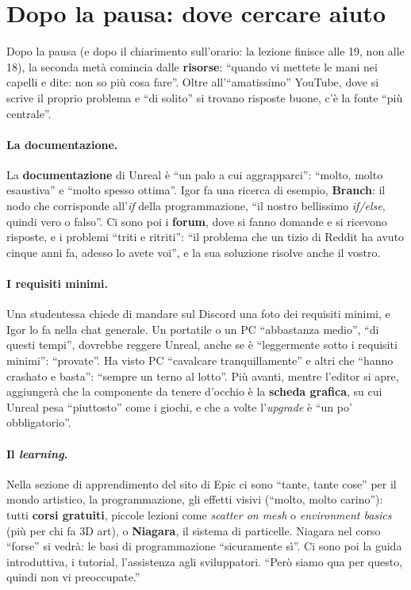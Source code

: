 \section{Dopo la pausa: dove cercare aiuto}
\label{ue1:sec:risorse}

Dopo la pausa (e dopo il chiarimento sull'orario: la lezione finisce alle 19, non alle
18), la seconda metà comincia dalle \textbf{risorse}: ``quando vi mettete le mani nei
capelli e dite: non so più cosa fare''. Oltre all'``amatissimo'' YouTube, dove si
scrive il proprio problema e ``di solito'' si trovano risposte buone, c'è la fonte
``più centrale''.

\paragraph{La documentazione.} La \textbf{documentazione} di Unreal è ``un palo a cui
aggrapparci'': ``molto, molto esaustiva'' e ``molto spesso ottima''. Igor fa una ricerca
di esempio, \textbf{Branch}: il nodo che corrisponde all'\emph{if} della
programmazione, ``il nostro bellissimo \emph{if/else}, quindi vero o falso''. Ci sono
poi i \textbf{forum}, dove si fanno domande e si ricevono risposte, e i problemi
``triti e ritriti'': ``il problema che un tizio di Reddit ha avuto cinque anni fa,
adesso lo avete voi'', e la sua soluzione risolve anche il vostro.

\paragraph{I requisiti minimi.} Una studentessa chiede di mandare sul Discord una foto
dei requisiti minimi, e Igor lo fa nella chat generale. Un portatile o un PC ``abbastanza
medio'', ``di questi tempi'', dovrebbe reggere Unreal, anche se è ``leggermente sotto i
requisiti minimi'': ``provate''. Ha visto PC ``cavalcare tranquillamente'' e altri che
``hanno crashato e basta'': ``sempre un terno al lotto''. Più avanti, mentre l'editor si
apre, aggiungerà che la componente da tenere d'occhio è la \textbf{scheda grafica}, su
cui Unreal pesa ``piuttosto'' come i giochi, e che a volte l'\emph{upgrade} è ``un po'
obbligatorio''.

\paragraph{Il \emph{learning}.} Nella sezione di apprendimento del sito di Epic ci sono
``tante, tante cose'' per il mondo artistico, la programmazione, gli effetti visivi
(``molto, molto carino''): tutti \textbf{corsi gratuiti}, piccole lezioni come
\emph{scatter on mesh} o \emph{environment basics} (più per chi fa 3D art), o
\textbf{Niagara}, il sistema di particelle. Niagara nel corso ``forse'' si vedrà: le
basi di programmazione ``sicuramente sì''. Ci sono poi la guida introduttiva, i
tutorial, l'assistenza agli sviluppatori. ``Però siamo qua per questo, quindi non vi
preoccupate.''

